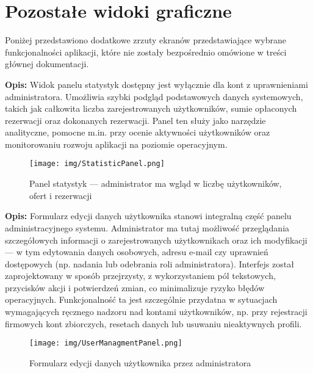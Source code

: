\chapter{Pozostałe widoki graficzne}
\label{cha:Pozostałe widoki graficzne}

Poniżej przedstawiono dodatkowe zrzuty ekranów przedstawiające wybrane funkcjonalności aplikacji, które nie zostały bezpośrednio omówione w treści głównej dokumentacji.


\noindent
{\small \textbf{Opis:} Widok panelu statystyk dostępny jest wyłącznie dla kont z uprawnieniami administratora. Umożliwia szybki podgląd podstawowych danych systemowych, takich jak całkowita liczba zarejestrowanych użytkowników, sumie opłaconych rezerwacji oraz dokonanych rezerwacji. Panel ten służy jako narzędzie analityczne, pomocne m.in. przy ocenie aktywności użytkowników oraz monitorowaniu rozwoju aplikacji na poziomie operacyjnym.}
\begin{figure}[H]
    \centering
    \texttt{[image: img/StatisticPanel.png]}
    \caption{Panel statystyk — administrator ma wgląd w liczbę użytkowników, ofert i rezerwacji}
    \label{fig:stat_gui}
\end{figure}


\noindent
{\small \textbf{Opis:} Formularz edycji danych użytkownika stanowi integralną część panelu administracyjnego systemu. Administrator ma tutaj możliwość przeglądania szczegółowych informacji o zarejestrowanych użytkownikach oraz ich modyfikacji — w tym edytowania danych osobowych, adresu e-mail czy uprawnień dostępowych (np. nadania lub odebrania roli administratora). Interfejs został zaprojektowany w sposób przejrzysty, z wykorzystaniem pól tekstowych, przycisków akcji i potwierdzeń zmian, co minimalizuje ryzyko błędów operacyjnych. Funkcjonalność ta jest szczególnie przydatna w sytuacjach wymagających ręcznego nadzoru nad kontami użytkowników, np. przy rejestracji firmowych kont zbiorczych, resetach danych lub usuwaniu nieaktywnych profili.}
\begin{figure}[H]
    \centering
    \texttt{[image: img/UserManagmentPanel.png]}
    \caption{Formularz edycji danych użytkownika przez administratora}
    \label{fig:user_edit_gui}
\end{figure}

